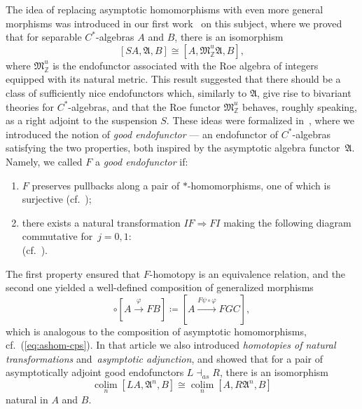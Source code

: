 \documentclass[10pt]{simplearticle}
\newcommand{\tikzinput}[1]{}
\newcommand{\colim}{\operatorname*{colim}}
\newcommand{\asadj}{\dashv_{as}}
\begin{document}
The idea of replacing asymptotic homomorphisms with even more general
morphisms was introduced
in our first work~\cite{makeev_2019}
on this subject, where we proved that for separable $C^{*}$-algebras
$A$ and $B$, there is an isomorphism
\[
\left[SA,\mathfrak{A},B\right]\cong\left[A,\mathfrak{M}^{u}_{\mathbb{Z}}\mathfrak{A},B\right],
\]
where $\mathfrak{M}^{u}_{\mathbb{Z}}$ is the endofunctor associated
with the Roe algebra of integers equipped with its natural metric.
This result suggested that there should be a class of sufficiently
nice endofunctors which, similarly to $\mathfrak{A}$, give rise to
bivariant theories for $C^{*}$-algebras, and that the Roe functor
$\mathfrak{M}^{u}_{\mathbb{Z}}$ behaves, roughly speaking, as a right
adjoint to the suspension $S$. These ideas were formalized in~\cite{makeev_unsuspended},
where we introduced the notion of \emph{good endofunctor} --- an
endofunctor of $C^{*}$-algebras satisfying the two properties, both
inspired by the asymptotic algebra functor~$\mathfrak{A}$. Namely,
we called $F$ a \emph{good endofunctor} if:%
\begin{enumerate}[label=\textup{\textbf{(G\arabic*)}}, ref=\textbf{(G\arabic*)}]

\item\label{enu:o1}$F$ preserves pullbacks along a pair of $*$-homomorphisms,
one of which is surjective (cf.~\cite[Lemma~2.5]{GHT});
\item\label{enu:o2}there exists a natural transformation $IF\Rightarrow FI$
making the following diagram commutative for~$j=0,1$:
\begin{equation}
\tikzinput{d579}\label{eq:proto-kappa}
\end{equation}
(cf.~\cite[proof of Lemma~2.9]{GHT}).
\end{enumerate}
The first property ensured that $F$-homotopy is an equivalence relation,
and the second one yielded a well-defined composition of generalized
morphisms
\begin{equation}
[B\xrightarrow{\psi}GC]\circ[A\xrightarrow{\varphi}FB]\coloneqq[A\xrightarrow{F\psi\circ\varphi}FGC],\label{eq:composition}
\end{equation}
which is analogous to the composition of asymptotic homomorphisms,
cf.~(\ref{eq:ashom-cps}). In that article we also introduced \emph{homotopies
of natural transformations} and\ 
\emph{asymptotic adjunction},
and showed that for a pair of asymptotically adjoint good endofunctors
$L\asadj R$, there is an isomorphism
\begin{equation}
\colim_{n}[LA,\mathfrak{A}^{n},B]\cong\colim_{n}[A,R\mathfrak{A}^{n},B]\label{eq:isomorphism}
\end{equation}
natural in $A$ and $B$.
\end{document}
